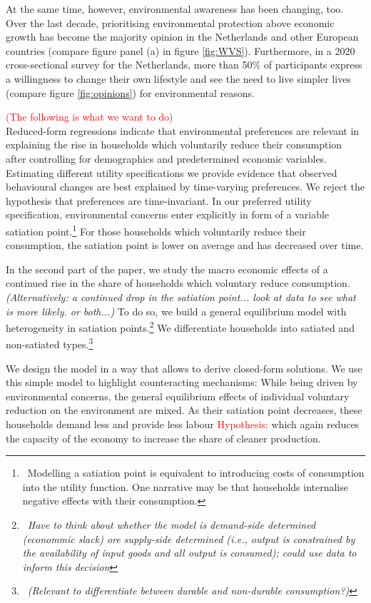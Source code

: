 \documentclass[12pt]{article}
\newcommand{\tr}[1]{\textcolor{red}{#1}}
\begin{document}
At the same time, however, environmental awareness has been changing, too. Over the last decade, prioritising environmental protection above economic growth has become the majority opinion in the Netherlands and other European countries (compare figure panel (a) in figure \ref{fig:WVS}). Furthermore, in a 2020 cross-sectional survey for the Netherlands, more than 50\% of participants express a willingness to change their own lifestyle and see the need to live simpler lives (compare figure \ref{fig:opinions}) for environmental reasons.

\tr{(The following is what we want to do)}\\
Reduced-form regressions indicate that environmental preferences are relevant in explaining the rise in households which voluntarily reduce their consumption after controlling for demographics and predetermined economic variables. 
Estimating different utility specifications we provide evidence that observed behavioural changes are best explained by time-varying preferences. We reject the hypothesis that preferences are time-invariant. In our preferred utility specification, environmental concerns enter explicitly in form of a variable satiation point.\footnote{\ Modelling a satiation point is equivalent to introducing costs of consumption into the utility function. One narrative may be that households internalise negative effects with their consumption. } For those households which voluntarily reduce their consumption, the satiation point is lower on average and has decreased over time. 

In the second part of the paper, we study the macro economic effects of a continued rise in the share of households which voluntary reduce consumption. \textit{(Alternatively: a continued drop in the satiation point... look at data to see what is more likely. or both...)} To do so, we build a general equilibrium model with heterogeneity in satiation points.\footnote{\ \textit{Have to think about whether the model is demand-side determined (econommic slack) ore supply-side determined (i.e., output is constrained by the availability of input goods and all output is consumed); could use data to inform this decision}} We differentiate households into satiated and non-satiated types.\footnote{\  \textit{(Relevant to differentiate between durable and non-durable consumption?)}}

We design the model in a way that allows to derive closed-form solutions. We use this simple model to highlight counteracting mechanisms:  
While being driven by environmental concerns, the general equilibrium effects of individual voluntary reduction on the environment are mixed.
 As their satiation point decreases, these households demand less and provide less labour \tr{Hypothesis:} which again reduces the capacity of the economy to increase the share of cleaner production. %
\end{document}
